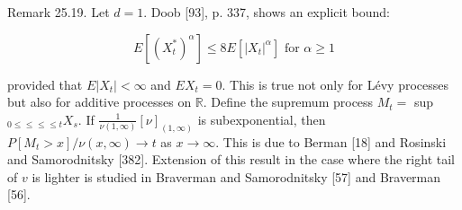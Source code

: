 \documentclass[a4paper,12pt]{article}
\begin{document}
Remark 25.19. Let $d=1$. Doob [93], p. 337, shows an explicit bound:


\begin{equation*}
    E\left[\left(X_{t}^{*}\right)^{\alpha}\right] \leq 8 E\left[\left|X_{t}\right|^{\alpha}\right] \text { for } \alpha \geq 1 \tag{25.16}
\end{equation*}


provided that $E\left|X_{t}\right|<\infty$ and $E X_{t}=0$. This is true not only for Lévy processes but also for additive processes on $\mathbb{R}$. Define the supremum process $M_{t}=$ sup $_{0 \leq \leq \leq \leq t} X_{s}$. If $\frac{1}{\nu(1, \infty)}[\nu]_{(1, \infty)}$ is subexponential, then $P\left[M_{t}>x\right] / \nu(x, \infty) \rightarrow t$ as $x \rightarrow \infty$. This is due to Berman [18] and Rosinski and Samorodnitsky [382]. Extension of this result in the case where the right tail of $v$ is lighter is studied in Braverman and Samorodnitsky [57] and Braverman [56].
\end{document}
